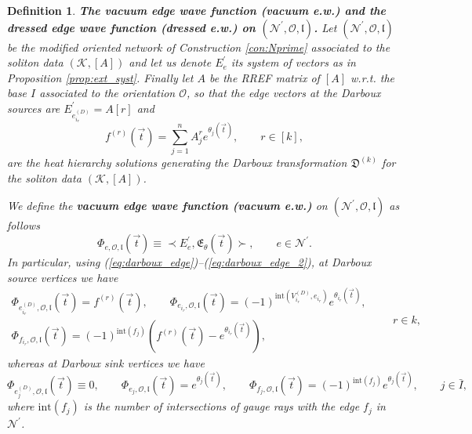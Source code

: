 \documentclass[11pt]{amsart}
\theoremstyle{plain}
\numberwithin{equation}{section}
\newtheorem{definition}{Definition}[subsection]
\begin{document}
\begin{definition}\label{def:vvw_gen}\textbf{The vacuum edge wave function (vacuum e.w.) and the dressed edge wave function (dressed e.w.) on $({\mathcal N}^{\prime}, \mathcal O, \mathfrak l)$.}
Let $({\mathcal N}^{\prime}, \mathcal O, \mathfrak l)$ be the modified oriented network of Construction \ref{con:Nprime} associated to the soliton data $(\mathcal K, [A])$ and let us denote $E_e^{\prime}$ its system of vectors as in Proposition \ref{prop:ext_syst}. Finally let $A$ be the 
RREF matrix of $[A]$ w.r.t. the base $I$ associated to the orientation $\mathcal O$, so that
the edge vectors at the Darboux sources are $E^{\prime}_{e_{i_r}^{(D)}} = A[r]$ and
\[
f^{(r)} (\vec t) = \sum_{j=1}^n A^r_j e^{\theta_j(\vec t)}, \quad\quad r\in [k],
\]
are the heat hierarchy solutions generating the Darboux transformation $\mathfrak D^{(k)}$ for the soliton data $(\mathcal K, [A])$.

We define the \textbf{vacuum edge wave function (vacuum e.w.)} on $({\mathcal N}^{\prime}, \mathcal O, \mathfrak l)$ as follows
\begin{equation}\label{eq:vvfN}
\Phi_{e, \mathcal O,\mathfrak l} (\vec t) \equiv \prec E_e^{\prime}, {\mathfrak E}_\theta (\vec t)\succ, \quad\quad e\in {\mathcal N}^{\prime}.
\end{equation}
In particular, using (\ref{eq:darboux_edge})--(\ref{eq:darboux_edge_2}), at Darboux source vertices we have
\begin{equation}\label{eq:vac_wf_source}
\begin{array}{l}
\Phi_{e^{(D)}_{i_r}, \mathcal O,\mathfrak l} (\vec t) =f^{(r)} (\vec t), \quad\quad
\Phi_{e_{i_r}, \mathcal O,\mathfrak l} (\vec t) = (-1)^{\mbox{int}(V^{(D)}_{i_r},e_{i_r})} e^{\theta_{i_r}(\vec t)},\\
\Phi_{f_{i_r}, \mathcal O,\mathfrak l} (\vec t) =(-1)^{\mbox{int}(f_j)} \left( f^{(r)} (\vec t) -e^{\theta_{i_r}(\vec t)} \right),
\end{array}
\quad\quad r\in k,
\end{equation}
whereas at Darboux sink vertices we have
\begin{equation}\label{eq:vac_wf_sink}
\Phi_{e^{(D)}_j, \mathcal O,\mathfrak l} (\vec t) \equiv 0, \quad\quad
\Phi_{e_j, \mathcal O,\mathfrak l} (\vec t) =e^{\theta_{j}(\vec t)},\quad\quad
\Phi_{f_j, \mathcal O,\mathfrak l} (\vec t) =(-1)^{\mbox{int}(f_j)}e^{\theta_{j}(\vec t)},
\quad\quad j\in \bar I,
\end{equation}
where $\mbox{int}(f_j)$ is the number of intersections of gauge rays with the edge $f_j$ in $\mathcal N^{\prime}$.


\end{definition}
\end{document}
